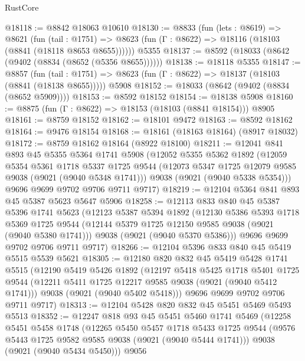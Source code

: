 \begin{lexlean}{RustCore}
\begin{coremodule}
@18118 := @8842 @18063 @10610
@18130 := @8833
    (fun (lets : @8619) =>
    @8621
      (fun (tail : @1751) =>
      @8623 (fun (Γ : @8622) => @18116 (@18103 (@8841 (@18118 @8653 @8655))))))
    @5355
@18137 := @8592 (@18033 (@8642 (@9402 (@8834 (@8652 (@5356 @8655))))))
@18138 := @18118 @5355
@18147 := @8857
    (fun (tail : @1751) => @8623 (fun (Γ : @8622) => @18137 (@18103 (@8841 (@18138 @8655)))))
    @5908
@18152 := @18033 (@8642 (@9402 (@8834 (@8652 @5909))))
@18153 := @8592 @18152
@18154 := @18138 @5908
@18160 := @8875 (fun (Γ : @8622) => @18153 (@18103 (@8841 @18154))) @8905
@18161 := @8759 @18152
@18162 := @18101 @9472
@18163 := @8592 @18162
@18164 := @9476 @18154
@18168 := @18161 (@18163 @18164) (@8917 @18032)
@18172 := @8759 @18162 @18164 (@8922 @18100)
@18211 := @12041
    @841
    @893
    @45
    @5355
    @5364
    @1741
    @5908
    (@12052
      @5355
      @5362
      @1892
      (@12059
        @5354
        @5361
        @1718
        @5337
        @1725
        @9544
        (@12073 @5347 @1725 @12079 @9585 @9038 (@9021 (@9040 @5348 @1741)))
        @9038
        (@9021 (@9040 @5338 @5354)))
      @9696
      @9699
      @9702
      @9706
      @9711
      @9717)
@18219 := @12104 @5364 @841 @893 @45 @5387 @5623 @5647 @5906
@18258 := @12113
    @833
    @840
    @45
    @5387
    @5396
    @1741
    @5623
    (@12123
      @5387
      @5394
      @1892
      (@12130
        @5386
        @5393
        @1718
        @5369
        @1725
        @9544
        (@12144 @5379 @1725 @12150 @9585 @9038 (@9021 (@9040 @5380 @1741)))
        @9038
        (@9021 (@9040 @5370 @5386)))
      @9696
      @9699
      @9702
      @9706
      @9711
      @9717)
@18266 := @12104 @5396 @833 @840 @45 @5419 @5515 @5539 @5621
@18305 := @12180
    @820
    @832
    @45
    @5419
    @5428
    @1741
    @5515
    (@12190
      @5419
      @5426
      @1892
      (@12197
        @5418
        @5425
        @1718
        @5401
        @1725
        @9544
        (@12211 @5411 @1725 @12217 @9585 @9038 (@9021 (@9040 @5412 @1741)))
        @9038
        (@9021 (@9040 @5402 @5418)))
      @9696
      @9699
      @9702
      @9706
      @9711
      @9717)
@18313 := @12104 @5428 @820 @832 @45 @5451 @5469 @5493 @5513
@18352 := @12247
    @818
    @93
    @45
    @5451
    @5460
    @1741
    @5469
    (@12258
      @5451
      @5458
      @1748
      (@12265
        @5450
        @5457
        @1718
        @5433
        @1725
        @9544
        (@9576 @5443 @1725 @9582 @9585 @9038 (@9021 (@9040 @5444 @1741)))
        @9038
        (@9021 (@9040 @5434 @5450)))
      @9056

\end{coremodule}
\end{lexlean}
